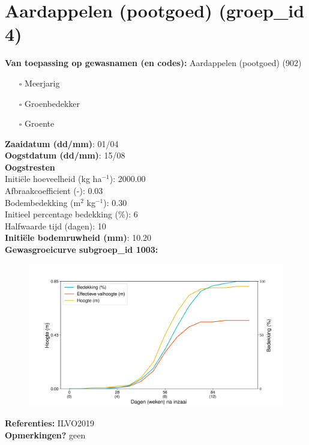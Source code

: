 \documentclass{article}
\begin{document}
 \section{Aardappelen (pootgoed) (groep\_id 4)} 
 \textbf{Van toepassing op gewasnamen (en codes):} Aardappelen (pootgoed) (902) 
 \begin{multicols}{3} \begin{itemize} \item[$\square$] Meerjarig \item[$\square$] Groenbedekker \item[$\square$] Groente \end{itemize} \end{multicols} 
  \textbf{Zaaidatum (dd/mm)}: 01/04  \vspace{0.10cm} \\ 
  \textbf{Oogstdatum (dd/mm)}: 15/08  \vspace{0.10cm} \\ 
  \textbf{Oogstresten} \vspace{0.05cm} \\ 
  \tab Initi\"{e}le hoeveelheid (kg ha$^{-1}$): 2000.00 \vspace{0.05cm} \\ 
  \tab Afbraakcoefficient (-): 0.03 \vspace{0.05cm} \\ 
  \tab Bodembedekking (m$^2$ kg$^{-1}$): 0.30 \vspace{0.05cm} \\ 
  \tab Initieel percentage bedekking (\%): 6 \vspace{0.05cm} \\ 
  \tab Halfwaarde tijd (dagen): 10 \vspace{0.05cm} \\ 
  \textbf{Initi\"{e}le bodemruwheid (mm)}: 10.20 \vspace{0.05cm} \\ 
  \textbf{Gewasgroeicurve subgroep\_id 1003:} 
 \begin{center} \begin{figure}[H] \includegraphics[width=12.5cm]{temp/1003.png} \end{figure} \end{center} 
  \textbf{Referenties:} ILVO2019 \vspace{0.10cm} \\ 
  \textbf{Opmerkingen?} geen \vspace{0.10cm} \\ 
 \newpage 
\end{document}
